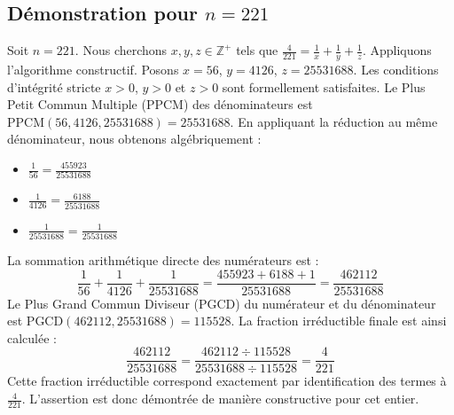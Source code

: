 \documentclass[11pt,a4paper]{article}
\begin{document}
\subsection{Démonstration pour $n = 221$}
Soit $n = 221$. Nous cherchons $x, y, z \in \mathbb{Z}^{+}$ tels que $\frac{4}{221} = \frac{1}{x} + \frac{1}{y} + \frac{1}{z}$.
Appliquons l'algorithme constructif. Posons $x = 56$, $y = 4126$, $z = 25531688$.
Les conditions d'intégrité stricte $x > 0$, $y > 0$ et $z > 0$ sont formellement satisfaites.
Le Plus Petit Commun Multiple (PPCM) des dénominateurs est $\text{PPCM}(56, 4126, 25531688) = 25531688$.
En appliquant la réduction au même dénominateur, nous obtenons algébriquement :
\begin{itemize}
    \item $\frac{1}{56} = \frac{455923}{25531688}$
    \item $\frac{1}{4126} = \frac{6188}{25531688}$
    \item $\frac{1}{25531688} = \frac{1}{25531688}$
\end{itemize}
La sommation arithmétique directe des numérateurs est :
$$ \frac{1}{56} + \frac{1}{4126} + \frac{1}{25531688} = \frac{455923 + 6188 + 1}{25531688} = \frac{462112}{25531688} $$
Le Plus Grand Commun Diviseur (PGCD) du numérateur et du dénominateur est $\text{PGCD}(462112, 25531688) = 115528$.
La fraction irréductible finale est ainsi calculée :
$$ \frac{462112}{25531688} = \frac{462112 \div 115528}{25531688 \div 115528} = \frac{4}{221} $$
Cette fraction irréductible correspond exactement par identification des termes à $\frac{4}{221}$. L'assertion est donc démontrée de manière constructive pour cet entier.
\end{document}
